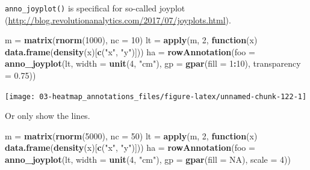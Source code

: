 \documentclass[]{book}
\newenvironment{Shaded}{\begin{snugshade}}{\end{snugshade}}
\newcommand{\KeywordTok}[1]{\textcolor[rgb]{0.13,0.29,0.53}{\textbf{#1}}}
\newcommand{\DataTypeTok}[1]{\textcolor[rgb]{0.13,0.29,0.53}{#1}}
\newcommand{\DecValTok}[1]{\textcolor[rgb]{0.00,0.00,0.81}{#1}}
\newcommand{\FloatTok}[1]{\textcolor[rgb]{0.00,0.00,0.81}{#1}}
\newcommand{\StringTok}[1]{\textcolor[rgb]{0.31,0.60,0.02}{#1}}
\newcommand{\OtherTok}[1]{\textcolor[rgb]{0.56,0.35,0.01}{#1}}
\newcommand{\ControlFlowTok}[1]{\textcolor[rgb]{0.13,0.29,0.53}{\textbf{#1}}}
\newcommand{\OperatorTok}[1]{\textcolor[rgb]{0.81,0.36,0.00}{\textbf{#1}}}
\newcommand{\NormalTok}[1]{#1}
\theoremstyle{definition}
\theoremstyle{definition}
\theoremstyle{definition}
\theoremstyle{remark}
\begin{document}
\texttt{anno\_joyplot()} is specifical for so-called joyplot
(\url{http://blog.revolutionanalytics.com/2017/07/joyplots.html}).

\begin{Shaded}
\begin{Highlighting}[]
\NormalTok{m =}\StringTok{ }\KeywordTok{matrix}\NormalTok{(}\KeywordTok{rnorm}\NormalTok{(}\DecValTok{1000}\NormalTok{), }\DataTypeTok{nc =} \DecValTok{10}\NormalTok{)}
\NormalTok{lt =}\StringTok{ }\KeywordTok{apply}\NormalTok{(m, }\DecValTok{2}\NormalTok{, }\ControlFlowTok{function}\NormalTok{(x) }\KeywordTok{data.frame}\NormalTok{(}\KeywordTok{density}\NormalTok{(x)[}\KeywordTok{c}\NormalTok{(}\StringTok{"x"}\NormalTok{, }\StringTok{"y"}\NormalTok{)]))}
\NormalTok{ha =}\StringTok{ }\KeywordTok{rowAnnotation}\NormalTok{(}\DataTypeTok{foo =} \KeywordTok{anno_joyplot}\NormalTok{(lt, }\DataTypeTok{width =} \KeywordTok{unit}\NormalTok{(}\DecValTok{4}\NormalTok{, }\StringTok{"cm"}\NormalTok{), }
    \DataTypeTok{gp =} \KeywordTok{gpar}\NormalTok{(}\DataTypeTok{fill =} \DecValTok{1}\OperatorTok{:}\DecValTok{10}\NormalTok{), }\DataTypeTok{transparency =} \FloatTok{0.75}\NormalTok{))}
\end{Highlighting}
\end{Shaded}

\begin{center}\texttt{[image: 03-heatmap\_annotations\_files/figure-latex/unnamed-chunk-122-1]} \end{center}

Or only show the lines.

\begin{Shaded}
\begin{Highlighting}[]
\NormalTok{m =}\StringTok{ }\KeywordTok{matrix}\NormalTok{(}\KeywordTok{rnorm}\NormalTok{(}\DecValTok{5000}\NormalTok{), }\DataTypeTok{nc =} \DecValTok{50}\NormalTok{)}
\NormalTok{lt =}\StringTok{ }\KeywordTok{apply}\NormalTok{(m, }\DecValTok{2}\NormalTok{, }\ControlFlowTok{function}\NormalTok{(x) }\KeywordTok{data.frame}\NormalTok{(}\KeywordTok{density}\NormalTok{(x)[}\KeywordTok{c}\NormalTok{(}\StringTok{"x"}\NormalTok{, }\StringTok{"y"}\NormalTok{)]))}
\NormalTok{ha =}\StringTok{ }\KeywordTok{rowAnnotation}\NormalTok{(}\DataTypeTok{foo =} \KeywordTok{anno_joyplot}\NormalTok{(lt, }\DataTypeTok{width =} \KeywordTok{unit}\NormalTok{(}\DecValTok{4}\NormalTok{, }\StringTok{"cm"}\NormalTok{), }\DataTypeTok{gp =} \KeywordTok{gpar}\NormalTok{(}\DataTypeTok{fill =} \OtherTok{NA}\NormalTok{), }
    \DataTypeTok{scale =} \DecValTok{4}\NormalTok{))}
\end{Highlighting}
\end{Shaded}
\end{document}
